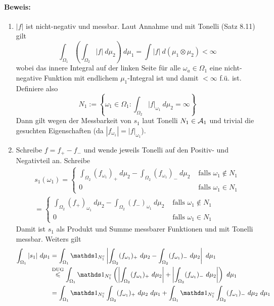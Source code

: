 \paragraph{Beweis:}
\begin{enumerate}[label=(\roman*)]
    \item $|f|$ ist nicht-negativ und messbar. Laut Annahme und mit Tonelli (Satz 8.11) gilt
    $$\int_{\Omega_1}\left(\int_{\Omega_2}|f|\ d\mu_2\right)\ d\mu_1=\int |f|\ d(\mu_1\otimes\mu_2)<\infty$$
    wobei das innere Integral auf der linken Seite f\"ur alle $\omega_a\in\Omega_1$ eine nicht-negative Funktion mit endlichem $\mu_1$-Integral ist und damit $<\infty$ f.\"u. ist. Definiere also
    $$N_1:=\left\{\omega_1\in\Omega_1:\int_{\Omega_2}|f|_{\omega_1}\ d\mu_2=\infty\right\}$$
    Dann gilt wegen der Messbarkeit von $s_1$ laut Tonelli $N_1\in\mathcal{A}_1$ und trivial die gesuchten Eigenschaften (da $|f_{\omega_1}|=|f|_{\omega_1}$).
    \item Schreibe $f=f_+-f_-$ und wende jeweils Tonelli auf den Positiv- und Negativteil an. Schreibe
    \begin{align*}
        s_1(\omega_1)=
        \begin{cases}
            \displaystyle\int_{\Omega_2}(f_{\omega_1})_+\ d\mu_2-\int_{\Omega_2}(f_{\omega_1})_-\ d\mu_2&\text{ falls }\omega_1\notin N_1 \\
            0&\text{ falls }\omega_1\in N_1
        \end{cases}\\
        =\begin{cases}
            \displaystyle\int_{\Omega_2}(f_+)_{\omega_1}\ d\mu_2-\int_{\Omega_2}(f_-)_{\omega_1}\ d\mu_2&\text{ falls }\omega_1\notin N_1 \\
            0&\text{ falls }\omega_1\in N_1
        \end{cases}
    \end{align*}
    Damit ist $s_1$ als Produkt und Summe messbarer Funktionen und mit Tonelli messbar. Weiters gilt
    \begin{align*}
        \int_{\Omega_1}|s_1|\ d\mu_1&=\int_{\Omega_1}\ind{N_1^c}\left|\int_{\Omega_2}(f_{\omega_1})_+\ d\mu_2-\int_{\Omega_2}(f_{\omega_1})_-\ d\mu_2\right|\ d\mu_1\\
        &\overset{\text{DUG}}{\leq}\int_{\Omega_1}\ind{N_1^c}\left(\left|\int_{\Omega_2}(f_{\omega_1})_+\ d\mu_2\right|+\left|\int_{\Omega_2}(f_{\omega_1})_-\ d\mu_2\right|\right)\ d\mu_1\\
        &=\int_{\Omega_1}\ind{N_1^c}\int_{\Omega_2}(f_{\omega_1})_+\ d\mu_2\ d\mu_1+\int_{\Omega_1}\ind{N_1^c}\int_{\Omega_2}(f_{\omega_1})_-  \ d\mu_2\ d\mu_1\\

\end{align*}
\end{enumerate}
